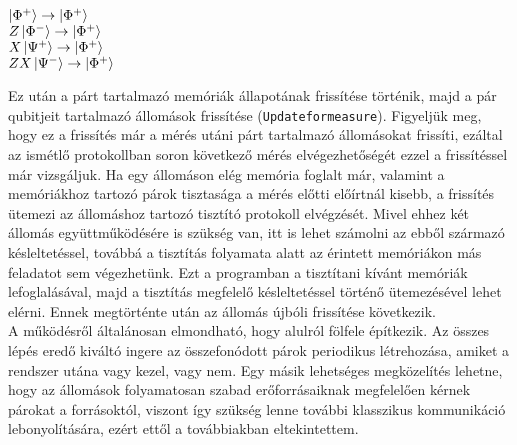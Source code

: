 \begin{center}
$\ket{\Phi^+} \rightarrow \ket{\Phi^+}$ \\
$Z\ket{\Phi^-} \rightarrow \ket{\Phi^+}$ \\
$X\ket{\Psi^+} \rightarrow \ket{\Phi^+}$ \\
$ZX\ket{\Psi^-} \rightarrow \ket{\Phi^+}$ \\
\end{center}
Ez után a párt tartalmazó memóriák állapotának frissítése történik, majd a pár qubitjeit tartalmazó állomások frissítése (\texttt{Updateformeasure}). Figyeljük meg, hogy ez a frissítés már a mérés utáni párt tartalmazó állomásokat frissíti, ezáltal az ismétlő protokollban soron következő mérés elvégezhetőségét ezzel a frissítéssel már vizsgáljuk.
Ha egy állomáson elég memória foglalt már, valamint a memóriákhoz tartozó párok tisztasága a mérés előtti előírtnál kisebb, a frissítés ütemezi az állomáshoz tartozó tisztító protokoll elvégzését. Mivel ehhez két állomás együttműködésére is szükség van, itt is lehet számolni az ebből származó késleltetéssel, továbbá a tisztítás folyamata alatt az érintett memóriákon más feladatot sem végezhetünk. Ezt a programban a tisztítani kívánt memóriák lefoglalásával, majd a tisztítás megfelelő késleltetéssel történő ütemezésével lehet elérni. Ennek megtörténte után az állomás újbóli frissítése következik. \\
A működésről általánosan elmondható, hogy alulról fölfele építkezik. Az összes lépés eredő kiváltó ingere az összefonódott párok periodikus létrehozása, amiket a rendszer utána vagy kezel, vagy nem. Egy másik lehetséges megközelítés lehetne, hogy az állomások folyamatosan szabad erőforrásaiknak megfelelően kérnek párokat a forrásoktól, viszont így szükség lenne további klasszikus kommunikáció lebonyolítására, ezért ettől a továbbiakban eltekintettem.


